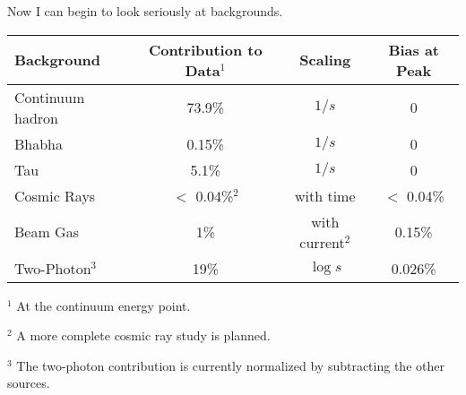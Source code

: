 \begin{slide*}

\slideframe{}
\huge
{}

\begin{minipage}[t]{\linewidth}
\large

{\LARGE Now I can begin to look seriously at backgrounds.}

\vspace{1 cm}

\begin{tabular}{l c c c}
Background & Contribution to Data$^1$ & Scaling & Bias at Peak \\\hline
Continuum hadron & 73.9\% & $1/s$ & 0 \\
Bhabha & 0.15\% & $1/s$ & 0 \\
Tau & 5.1\% & $1/s$ & 0 \\
Cosmic Rays & $<$ 0.04\%$^2$ & with time & $<$ 0.04\% \\
Beam Gas & 1\% & with current$^2$ & 0.15\% \\
Two-Photon$^3$ & 19\% & $\log s$ & 0.026\% \\
\end{tabular}

\vspace{1 cm}

$^1$ At the continuum energy point.

$^2$ A more complete cosmic ray study is planned.

$^3$ The two-photon contribution is currently normalized by
subtracting the other sources.

\end{minipage}

\end{slide*}


